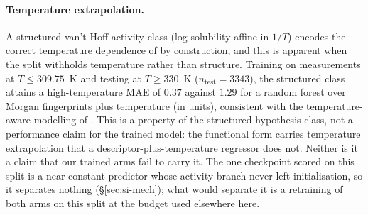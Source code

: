 \paragraph{Temperature extrapolation.} A structured van't Hoff activity class (log-solubility affine in $1/T$) encodes the correct temperature dependence of \lng{} by construction, and this is apparent when the split withholds temperature rather than structure. Training on measurements at $T \le 309.75$~K and testing at $T \ge 330$~K ($n_{\text{test}} = 3343$), the structured class attains a high-temperature MAE of $0.37$ against $1.29$ for a random forest over Morgan fingerprints plus temperature (in \lnx{} units), consistent with the temperature-aware \lngi{} modelling of \cite{sanchezmedina2023}. This is a property of the structured hypothesis class, not a performance claim for the trained model: the functional form carries temperature extrapolation that a descriptor-plus-temperature regressor does not. Neither is it a claim that our trained arms fail to carry it. The one checkpoint scored on this split is a near-constant predictor whose activity branch never left initialisation, so it separates nothing (\S\ref{sec:si-mech}); what would separate it is a retraining of both arms on this split at the budget used elsewhere here.

